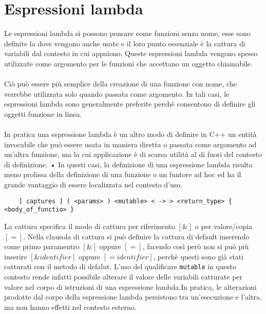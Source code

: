 \section{Espressioni lambda}
Le espressioni lambda si possono pensare come funzioni senza nome, esse sono definite la dove vengono anche usate e il loro punto essenziale è la cattura di variabili dal contesto in cui appaiono.
Queste espressioni lambda vengono spesso utilizzate come argomento
per le funzioni che accettano un oggetto chiamabile.

\paragraph{}
 Ciò può essere più semplice della creazione di una funzione con nome, che
verrebbe utilizzata solo quando passata come argomento. In tali
casi, le espressioni lambda sono generalmente preferite perché
consentono di definire gli oggetti funzione in linea.
\paragraph{}
In pratica una espressione lambda è un altro modo di definire in
C++ un entità invocabile che può essere usata in maniera diretta o
passata come argomento ad un’altra funzione, ma la cui
applicazione è di scarsa utilità al di fuori del contesto di definizione.
• In questi casi, la definizione di una espressione lambda risulta meno
prolissa della definizione di una funzione o un funtore ad hoc ed ha il
grande vantaggio di essere localizzata nel contesto d’uso.

\begin{verbatim}
    [ captures ] ( <params> ) <mutable> < -> > <return_type> { <body_of_functio> }
\end{verbatim}

La cattura specifica il modo di cattura per riferimento $[\&]$ o per valore/copia $[=]$. 
Nella clausola di cattura si può definire la cattura di default inserendo come primo paramentro $[\&]$ oppure $[=]$, facendo così però non si può più inserire $[\&identifier]$ oppure $[=identifier]$, perchè questi sono già stati catturati con il metodo di defalut.
L’uso del qualificare \verb|mutable| in questo contesto rende infatti possibile alterare il valore delle variabili catturate per valore nel corpo di istruzioni di una espressione lambda.In pratica, le alterazioni prodotte dal corpo della espressione lambda
persistono tra un’esecuzione e l’altra, ma non hanno effetti nel
contesto esterno.

